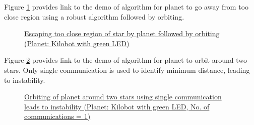 \documentclass{report}[12pt]
\begin{document}

Figure \ref{fig:orbit_after_escape} provides link to the demo of algorithm for planet to go away from too close region using a robust algorithm followed by orbiting.
\begin{figure}[H]
    \centering
    \caption{\href{https://youtu.be/X6dGCLT0ho8}{Escaping too close region of star by planet followed by orbiting (Planet: Kilobot with green LED)}}
    \label{fig:orbit_after_escape}
\end{figure}

Figure \ref{fig:orbit_two_star_comm1} provides link to the demo of algorithm for planet to orbit around two stars. Only single communication is used to identify minimum distance, leading to instability.
\begin{figure}[H]
    \centering
    \caption{\href{https://youtu.be/mhW04WvGKuQ}{Orbiting of planet around two stars using single communication leads to instability (Planet: Kilobot with green LED, No. of communications = 1)}}
    \label{fig:orbit_two_star_comm1}
\end{figure}
\end{document}
